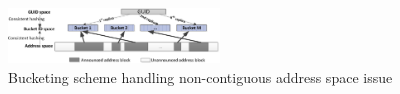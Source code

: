  \begin{center}
        \begin{figure}[t]
            \centering
            \includegraphics[width=0.5\textwidth]{figures/bucketting.eps}
            \caption{Bucketing scheme handling non-contiguous address space issue}
            \label{fig:bucketing}
            \vspace{-0.2in}
        \end{figure}
    \end{center}


